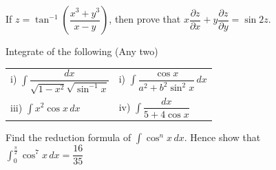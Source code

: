\documentclass[12pt]{article}
\begin{document}
\begin{itemize}
{\begin{itemize}
{      \item[c)] If $z=\tan^{-1}\left(\dfrac{x^3+y^3}{x-y}\right)$, then prove that $x\dfrac{\partial z}{\partial x}+y\dfrac{\partial z}{\partial y}=\sin 2z$.}
    \end{itemize}
    \item[Q6.] \begin{itemize}
      {\large
      \item[a)] Integrate of the following (Any two)\\
      \begin{tabular}{ll}
          i) $\int \dfrac{dx}{\sqrt{1-x^2}\sqrt{\sin^{-1}x}}$ & i) $\int \dfrac{\cos x}{a^2+b^2 \sin^2x}\,dx$\\
          iii) $\int x^2\cos x\,dx$ & iv) $\int \dfrac{dx}{5+4\cos x}$
      \end{tabular}
      \item[b)]Find the reduction formula of $\int \cos^nx\,dx$. Hence show that\\$\int_0^\frac{\pi}{2}\cos^7x\,dx=\dfrac{16}{35}$}
    \end{itemize}
    \item[Q7.] \begin{itemize}
      {\large
      \item[a)] 
      \item[b)] 
      \item[c)] 
      \item[d)]}
    \end{itemize}
    \item[Q8.] \begin{itemize}
      {\large
      \item[a)] 
      \item[b)] 
      \item[c)] 
      \item[d)]}
    \end{itemize}}
  \end{itemize}
\end{document}
